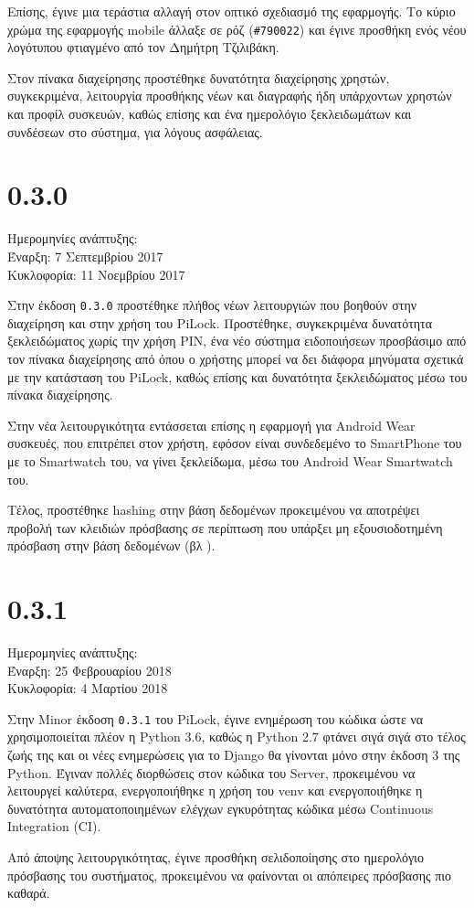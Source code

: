 	Επίσης, έγινε μια τεράστια αλλαγή στον οπτικό σχεδιασμό της εφαρμογής. Το κύριο χρώμα της εφαρμογής mobile άλλαξε σε ρόζ (\verb|#790022|) και έγινε προσθήκη ενός νέου λογότυπου φτιαγμένο από τον Δημήτρη Τζιλιβάκη.

	Στον πίνακα διαχείρησης προστέθηκε δυνατότητα διαχείρησης χρηστών, συγκεκριμένα, λειτουργία προσθήκης νέων και διαγραφής ήδη υπάρχοντων χρηστών και προφίλ συσκευών, καθώς επίσης και ένα ημερολόγιο ξεκλειδωμάτων και συνδέσεων στο σύστημα, για λόγους ασφάλειας.  

\section{0.3.0}
	Ημερομηνίες ανάπτυξης:\\Έναρξη: 7 Σεπτεμβρίου 2017\\Κυκλοφορία: 11 Νοεμβρίου 2017

	Στην έκδοση \verb|0.3.0| προστέθηκε πλήθος νέων λειτουργιών που βοηθούν στην διαχείρηση και στην χρήση του PiLock. Προστέθηκε, συγκεκριμένα δυνατότητα ξεκλειδώματος χωρίς την χρήση PIN, ένα νέο σύστημα ειδοποιήσεων προσβάσιμο από τον πίνακα διαχείρησης από όπου ο χρήστης μπορεί να δει διάφορα μηνύματα σχετικά με την κατάσταση του PiLock, καθώς επίσης και δυνατότητα ξεκλειδώματος μέσω του πίνακα διαχείρησης.

	Στην νέα λειτουργικότητα εντάσσεται επίσης η εφαρμογή για Android Wear συσκευές, που επιτρέπει στον χρήστη, εφόσον είναι συνδεδεμένο το SmartPhone του με το Smartwatch του, να γίνει ξεκλείδωμα, μέσω του Android Wear Smartwatch του.

	Τέλος, προστέθηκε hashing στην βάση δεδομένων προκειμένου να αποτρέψει προβολή των κλειδιών πρόσβασης σε περίπτωση που υπάρξει μη εξουσιοδοτημένη πρόσβαση στην βάση δεδομένων (βλ ). 


\section{0.3.1}
	Ημερομηνίες ανάπτυξης:\\Έναρξη: 25 Φεβρουαρίου 2018\\Κυκλοφορία: 4 Μαρτίου 2018

	Στην Minor έκδοση \verb|0.3.1| του PiLock, έγινε ενημέρωση του κώδικα ώστε να χρησιμοποιείται πλέον η Python 3.6, καθώς η Python 2.7 φτάνει σιγά σιγά στο τέλος ζωής της και οι νέες ενημερώσεις για το Django θα γίνονται μόνο στην έκδοση 3 της Python. Έγιναν πολλές διορθώσεις στον κώδικα του Server, προκειμένου να λειτουργεί καλύτερα, ενεργοποιήθηκε η χρήση του venv και ενεργοποιήθηκε η δυνατότητα αυτοματοποιημένων ελέγχων εγκυρότητας κώδικα μέσω Continuous Integration (CI).

	Από άποψης λειτουργικότητας, έγινε προσθήκη σελιδοποίησης στο ημερολόγιο πρόσβασης του συστήματος, προκειμένου να φαίνονται οι απόπειρες πρόσβασης πιο καθαρά.
